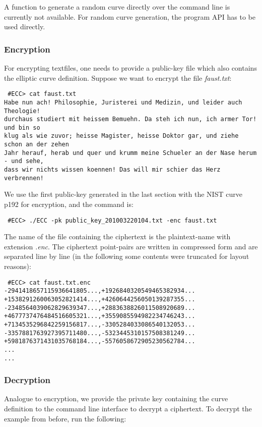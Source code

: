 \documentclass[11pt,english]{article}
\begin{document}
A function to generate a random curve directly over the command line is currently not available. For random curve generation, the program API has to be used directly.

\subsubsection{Encryption}
For encrypting textfiles, one needs to provide a public-key file which also contains the elliptic curve definition. Suppose we want to encrypt the file \emph{faust.txt}:

\begin{verbatim}
 #ECC> cat faust.txt
Habe nun ach! Philosophie, Juristerei und Medizin, und leider auch Theologie!
durchaus studiert mit heissem Bemuehn. Da steh ich nun, ich armer Tor! und bin so
klug als wie zuvor; heisse Magister, heisse Doktor gar, und ziehe schon an der zehen
Jahr herauf, herab und quer und krumm meine Schueler an der Nase herum - und sehe,
dass wir nichts wissen koennen! Das will mir schier das Herz verbrennen!
\end{verbatim}

We use the first public-key generated in the last section with the NIST curve p192 for encryption, and the command is:

\begin{verbatim}
 #ECC> ./ECC -pk public_key_201003220104.txt -enc faust.txt
\end{verbatim}

The name of the file containing the ciphertext is the plaintext-name with extension \emph{.enc}. The ciphertext point-pairs are written in compressed form and are separated line by line (in the following some contents were truncated for layout reasons):

\begin{verbatim}
 #ECC> cat faust.txt.enc
-2941418657115936641805...,+1926840320549465382934...
+1538291260063052821414...,+4260644256050139287355...
-2348564039062829639347...,+2883638826011508920689...
+4677737476484516605321...,+3559085594982234746243...
+7134535296842259156817...,-3305284033086540132053...
-3357881763927395711480...,-5323445310157508381249...
+5981876371431035768184...,-5576058672905230562784...
...
...
\end{verbatim}

\subsubsection{Decryption}
Analogue to encryption, we provide the private key containing the curve definition to the command line interface to decrypt a ciphertext. To decrypt the example from before, run the following:
\end{document}
